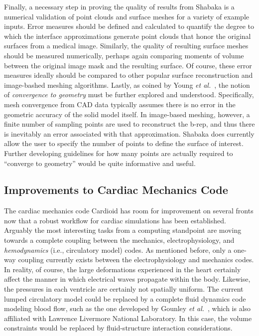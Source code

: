 Finally, a necessary step in proving the quality of results from Shabaka is a numerical validation of point clouds and surface meshes for a variety of example inputs. Error measures should be defined and calculated to quantify the degree to which the interface approximations generate point clouds that honor the original surfaces from a medical image. Similarly, the quality of resulting surface meshes should be measured numerically, perhaps again comparing moments of volume between the original image mask and the resulting surface. Of course, these error measures ideally should be compared to other popular surface reconstruction and image-bashed meshing algorithms. Lastly, as coined by Young \textit{et al.}~\cite{young_2008}, the notion of \textit{convergence to geometry} must be further explored and understood. Specifically, mesh convergence from CAD data typically assumes there is no error in the geometric accuracy of the solid model itself. In image-based meshing, however, a finite number of sampling points are used to reconstruct the b-rep, and thus there is inevitably an error associated with that approximation. Shabaka does currently allow the user to specify the number of points to define the surface of interest. Further developing guidelines for how many points are actually required to ``converge to geometry'' would be quite informative and useful.

\subsection{Improvements to Cardiac Mechanics Code}
\label{Improvements to Cardiac Mechanics Code}

The cardiac mechanics code Cardioid has room for improvement on several fronts now that a robust workflow for cardiac simulations has been established. Arguably the most interesting tasks from a computing standpoint are moving towards a complete coupling between the mechanics, electrophysiology, and \textit{hemodynamics} (i.e., circulatory model) codes. As mentioned before, only a one-way coupling currently exists between the electrophysiology and mechanics codes. In reality, of course, the large deformations experienced in the heart certainly affect the manner in which electrical waves propagate within the body. Likewise, the pressures in each ventricle are certainly not spatially uniform. The current lumped circulatory model could be replaced by a complete fluid dynamics code modeling blood flow, such as the one developed by Gounley \textit{et al.}~\cite{gounley_2017}, which is also affiliated with Lawrence Livermore National Laboratory. In this case, the volume constraints would be replaced by fluid-structure interaction considerations.

